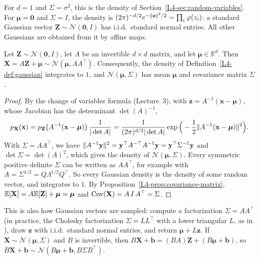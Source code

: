 For $d = 1$ and $\Sigma = \sigma^2$, this is the density of Section~\ref{L4-sec:random-variables}. For $\boldsymbol{\mu} = \mathbf{0}$ and $\Sigma = I$, the density is $(2\pi)^{-d/2}e^{-\lVert \mathbf{z} \rVert^2/2} = \prod_i \varphi(z_i)$: a standard Gaussian vector $\mathbf{Z} \sim \mathcal{N}(\mathbf{0}, I)$ has i.i.d.\ standard normal entries. All other Gaussians are obtained from it by affine maps.

\begin{theorem}\label{L4-thm:gaussian-affine}
    Let $\mathbf{Z} \sim \mathcal{N}(\mathbf{0}, I)$, let $A$ be an invertible $d \times d$ matrix, and let $\boldsymbol{\mu} \in \mathbb{R}^d$. Then $\mathbf{X} = A\mathbf{Z} + \boldsymbol{\mu} \sim \mathcal{N}(\boldsymbol{\mu}, AA^\top)$. Consequently, the density of Definition~\ref{L4-def:gaussian} integrates to $1$, and $\mathcal{N}(\boldsymbol{\mu}, \Sigma)$ has mean $\boldsymbol{\mu}$ and covariance matrix $\Sigma$.
\end{theorem}

\begin{proof}
    By the change of variables formula (Lecture~3), with $\mathbf{z} = A^{-1}(\mathbf{x} - \boldsymbol{\mu})$, whose Jacobian has the determinant $\det(A)^{-1}$,
    \[p_{\mathbf{X}}(\mathbf{x}) = p_{\mathbf{Z}}\big(A^{-1}(\mathbf{x} - \boldsymbol{\mu})\big)\,\frac{1}{|\det A|} = \frac{1}{(2\pi)^{d/2}|\det A|}\exp\Big(-\frac{1}{2}\lVert A^{-1}(\mathbf{x} - \boldsymbol{\mu}) \rVert^2\Big).\]
    With $\Sigma = AA^\top$, we have $\lVert A^{-1}\mathbf{y} \rVert^2 = \mathbf{y}^\top A^{-\top}A^{-1}\mathbf{y} = \mathbf{y}^\top\Sigma^{-1}\mathbf{y}$ and $\det\Sigma = \det(A)^2$, which gives the density of $\mathcal{N}(\boldsymbol{\mu}, \Sigma)$. Every symmetric positive definite $\Sigma$ can be written as $AA^\top$, for example with $A = \Sigma^{1/2} = Q\Lambda^{1/2}Q^\top$. So every Gaussian density is the density of some random vector, and integrates to $1$. By Proposition~\ref{L4-prop:covariance-matrix}, $\mathbb{E}[\mathbf{X}] = A\mathbb{E}[\mathbf{Z}] + \boldsymbol{\mu} = \boldsymbol{\mu}$ and $\operatorname{Cov}(\mathbf{X}) = A\,I\,A^\top = \Sigma$.
\end{proof}

This is also how Gaussian vectors are sampled: compute a factorization $\Sigma = AA^\top$ (in practice, the Cholesky factorization $\Sigma = LL^\top$ with a lower triangular $L$, as in ), draw $\mathbf{z}$ with i.i.d.\ standard normal entries, and return $\boldsymbol{\mu} + L\mathbf{z}$. If $\mathbf{X} \sim \mathcal{N}(\boldsymbol{\mu}, \Sigma)$ and $B$ is invertible, then $B\mathbf{X} + \mathbf{b} = (BA)\mathbf{Z} + (B\boldsymbol{\mu} + \mathbf{b})$, so $B\mathbf{X} + \mathbf{b} \sim \mathcal{N}(B\boldsymbol{\mu} + \mathbf{b}, B\Sigma B^\top)$.

